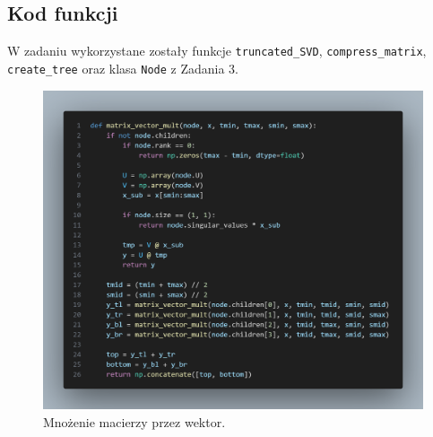 \documentclass[11pt, leqno]{scrartcl}
\begin{document}
    \subsection{Kod funkcji}
    W zadaniu wykorzystane zostały funkcje \texttt{truncated\_SVD},
    \texttt{compress\_matrix}, \\
    \texttt{create\_tree} oraz klasa \texttt{Node} z Zadania 3.
    \begin{figure}[H]
        \centering
        \includegraphics[width=1\linewidth]{matrix_vector.png}
        \caption{Mnożenie macierzy przez wektor.}
    \end{figure}
\end{document}
